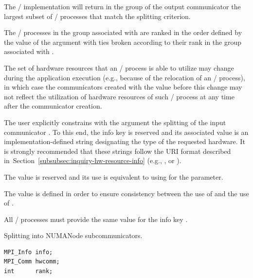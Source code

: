 \begin{description}
  The \MPI/ implementation will return in the group of the output communicator 
  the largest subset of \MPI/ processes that match the splitting criterion.

  The \MPI/ processes in the group associated with  are ranked in the order defined by
  the value of the argument  with ties broken according to their rank in the group
  associated with .
  
  \begin{users}
    The set of hardware resources that an \MPI/ process is able to utilize may change during the
    application execution (e.g., because of the relocation of an \MPI/ process), in which case the communicators
    created with the value  before this change may not reflect
    the utilization of hardware resources of such \MPI/ process at any time after the communicator creation. 
  \end{users}
  
  The user explicitly constrains with the  argument the splitting of the input communicator
  . To this end, the info key  is reserved and its associated
  value is an implementation-defined string designating the type of the requested hardware. 
  It is strongly recommended that these strings follow the URI format described in~Section~\ref{subsubsec:inquiry-hw-resource-info}
  (e.g., ,  or ).

  The value  is reserved and its use is equivalent to using 
  for the  parameter.
  \begin{rationale}
    The value  is defined in order to ensure consistency between
    the use of  and the use of .
  \end{rationale}

  All \MPI/ processes must provide the same value for the info key .

  \begin{example}
  \label{ex:hw-based split}
  Splitting  into NUMANode subcommunicators.
\begin{lstlisting}[language={[MPI]C}]
MPI_Info info;
MPI_Comm hwcomm;
int      rank;


\end{lstlisting}
\end{example}
\end{description}
